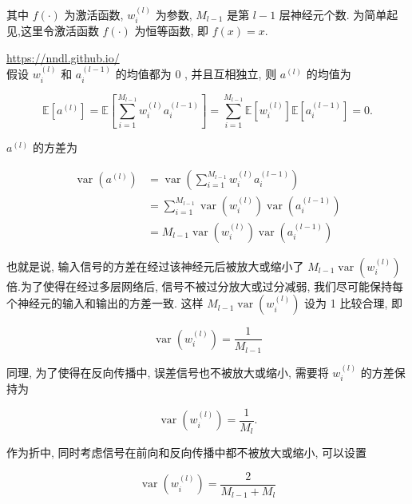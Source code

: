 \documentclass[10pt]{article}
\begin{document}
其中 $f(\cdot)$ 为激活函数, $w_{i}^{(l)}$ 为参数, $M_{l-1}$ 是第 $l-1$ 层神经元个数. 为简单起见,这里令激活函数 $f(\cdot)$ 为恒等函数, 即 $f(x)=x$.

\href{https://nndl.github.io/}{https://nndl.github.io/}\\
假设 $w_{i}^{(l)}$ 和 $a_{i}^{(l-1)}$ 的均值都为 0 , 并且互相独立, 则 $a^{(l)}$ 的均值为


\begin{equation*}
\mathbb{E}\left[a^{(l)}\right]=\mathbb{E}\left[\sum_{i=1}^{M_{l-1}} w_{i}^{(l)} a_{i}^{(l-1)}\right]=\sum_{i=1}^{M_{l-1}} \mathbb{E}\left[w_{i}^{(l)}\right] \mathbb{E}\left[a_{i}^{(l-1)}\right]=0 . \tag{7.38}
\end{equation*}


$a^{(l)}$ 的方差为


\begin{align*}
\operatorname{var}\left(a^{(l)}\right) & =\operatorname{var}\left(\sum_{i=1}^{M_{l-1}} w_{i}^{(l)} a_{i}^{(l-1)}\right)  \tag{7.39}\\
& =\sum_{i=1}^{M_{l-1}} \operatorname{var}\left(w_{i}^{(l)}\right) \operatorname{var}\left(a_{i}^{(l-1)}\right)  \tag{7.40}\\
& =M_{l-1} \operatorname{var}\left(w_{i}^{(l)}\right) \operatorname{var}\left(a_{i}^{(l-1)}\right) \tag{7.41}
\end{align*}


也就是说, 输入信号的方差在经过该神经元后被放大或缩小了 $M_{l-1} \operatorname{var}\left(w_{i}^{(l)}\right)$ 倍.为了使得在经过多层网络后, 信号不被过分放大或过分减弱, 我们尽可能保持每个神经元的输入和输出的方差一致. 这样 $M_{l-1} \operatorname{var}\left(w_{i}^{(l)}\right)$ 设为 1 比较合理, 即


\begin{equation*}
\operatorname{var}\left(w_{i}^{(l)}\right)=\frac{1}{M_{l-1}} \tag{7.42}
\end{equation*}


同理, 为了使得在反向传播中, 误差信号也不被放大或缩小, 需要将 $w_{i}^{(l)}$ 的方差保持为


\begin{equation*}
\operatorname{var}\left(w_{i}^{(l)}\right)=\frac{1}{M_{l}} . \tag{7.43}
\end{equation*}


作为折中, 同时考虑信号在前向和反向传播中都不被放大或缩小, 可以设置


\begin{equation*}
\operatorname{var}\left(w_{i}^{(l)}\right)=\frac{2}{M_{l-1}+M_{l}} \tag{7.44}
\end{equation*}
\end{document}

